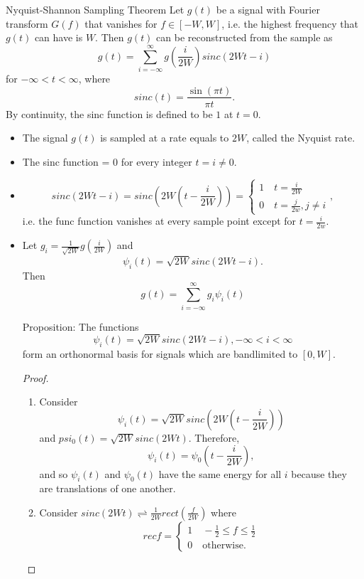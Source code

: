\documentclass[../main.tex]{subfiles}
\begin{document}
\begin{bbox}{Nyquist-Shannon Sampling Theorem}
    Let $g(t)$ be a signal with Fourier transform $G(f)$ that vanishes for $f\in[-W,W]$, i.e. the highest frequency that $g(t)$ can have is $W$. Then $g(t)$ can be reconstructed from the sample as \[
    g(t) =\sum_{i=-\infty}^\infty g(\frac{i}{2W})sinc(2Wt-i)
    \] for $-\infty < t <\infty$, where \[
    sinc(t) = \frac{\sin(\pi t)}{\pi t}.
    \]
    By continuity, the sinc function is defined to be $1$ at $t=0$.
    \begin{itemize}
        \item The signal $g(t)$ is sampled at a rate equals to $2W$, called the Nyquist rate.
        \item The sinc function = 0 for every integer $t=i\neq 0$.
        \item \[
        sinc(2Wt -i)=sinc(2W(t-\frac{i}{2W}))=\begin{cases}
            1 \quad t=\frac{i}{2W}\\
            0 \quad t=\frac{j}{2w}, j\neq i
        \end{cases},
        \] i.e. the func function vanishes at every sample point except for $t=\frac{i}{2w}$.
        \item Let $g_i=\frac{1}{\sqrt{2W}}g(\frac{i}{2W})$ and \[
        \psi_i(t)=\sqrt{2W} sinc(2Wt-i).
        \] Then \[
        g(t) =\sum_{i=-\infty}^\infty g_i \psi_i(t)
        \]
        \begin{remark}
            Proposition: The functions \[
        \psi_i(t)=\sqrt{2W} sinc(2Wt-i), -\infty < i <\infty
        \] form an orthonormal basis for signals which are bandlimited to $[0,W]$.
        \begin{proof}
        \begin{enumerate}
            \item Consider \[
            \psi_i(t)=\sqrt{2W}sinc(2W(t-\frac{i}{2W}))
            \] and $psi_0(t)=\sqrt{2W}sinc(2Wt)$. Therefore, \[
            \psi_i(t)=\psi_0(t-\frac{i}{2W}),
            \] and so $\psi_i(t)$ and $\psi_0(t)$ have the same energy for all $i$ because they are translations of one another.
            \item Consider $sinc(2Wt)\rightleftharpoons \frac{1}{2W}rect(\frac{f}{2W})$ where \[
            recf =\begin{cases}
                1 \quad -\frac{1}{2} \leq f \leq \frac{1}{2}\\
                0 \quad \text{otherwise.}
            \end{cases}
\]
\end{enumerate}
\end{proof}
\end{remark}
\end{itemize}
\end{bbox}
\end{document}
